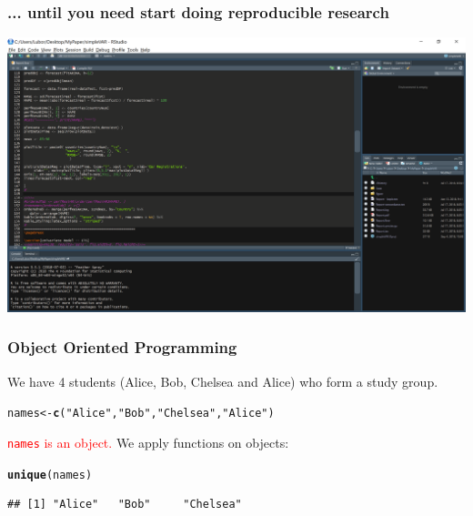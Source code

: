 \documentclass[12pt]{beamer}\usepackage[]{graphicx}\usepackage[]{color}
\makeatletter
\newcommand{\hlstr}[1]{\textcolor[rgb]{0.192,0.494,0.8}{#1}}%
\newcommand{\hlstd}[1]{\textcolor[rgb]{0.345,0.345,0.345}{#1}}%
\newcommand{\hlkwb}[1]{\textcolor[rgb]{0.69,0.353,0.396}{#1}}%
\newcommand{\hlkwd}[1]{\textcolor[rgb]{0.737,0.353,0.396}{\textbf{#1}}}%
\newenvironment{kframe}{%
 \def\at@end@of@kframe{}%
 \ifinner\ifhmode%
  \def\at@end@of@kframe{\end{minipage}}%
  \begin{minipage}{\columnwidth}%
 \fi\fi%
 \def\FrameCommand##1{\hskip\@totalleftmargin \hskip-\fboxsep
 \colorbox{shadecolor}{##1}\hskip-\fboxsep
     \hskip-\linewidth \hskip-\@totalleftmargin \hskip\columnwidth}%
 \MakeFramed {\advance\hsize-\width
   \@totalleftmargin\z@ \linewidth\hsize
   \@setminipage}}%
 {\par\unskip\endMakeFramed%
 \at@end@of@kframe}
\newenvironment{knitrout}{}{} %
\makeatother
\begin{document}

\begin{frame}
\frametitle{... until you need start doing reproducible research}
\includegraphics[width=\textwidth,height=\textheight,keepaspectratio]{./Images/03_rStudio}
\end{frame}


\begin{frame}[fragile]\large
\frametitle{Object Oriented Programming}

We have 4 students (Alice, Bob, Chelsea and Alice) who form a study group.

\begin{knitrout}
\color{fgcolor}\begin{kframe}
\begin{alltt}
\hlstd{names} \hlkwb{<-} \hlkwd{c}\hlstd{(}\hlstr{"Alice"}\hlstd{,} \hlstr{"Bob"}\hlstd{,} \hlstr{"Chelsea"}\hlstd{,} \hlstr{"Alice"}\hlstd{)}
\end{alltt}
\end{kframe}
\end{knitrout}

\textcolor{red}{\texttt{names} is an object.}  We apply functions on objects:

\begin{knitrout}
\color{fgcolor}\begin{kframe}
\begin{alltt}
\hlkwd{unique}\hlstd{(names)}
\end{alltt}
\begin{verbatim}
## [1] "Alice"   "Bob"     "Chelsea"
\end{verbatim}
\end{kframe}
\end{knitrout}

\end{frame}
\end{document}
